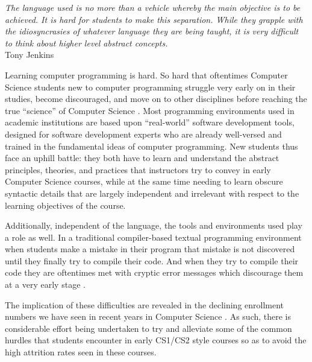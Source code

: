 \label{chapter:introduction}

\begin{flushright}
\textit{The language used is no more than a vehicle whereby the main objective is to be achieved. It is hard for students to make this separation. While they grapple with the idiosyncrasies of whatever language they are being taught, it is very difficult to think about higher level abstract concepts.}
\\
Tony Jenkins \cite{Jenkins02} \\
\end{flushright}

Learning computer programming is hard.  So hard that oftentimes Computer Science students new to computer programming struggle
very early on in their studies, become discouraged, and move on to other disciplines before reaching the true ``science'' of Computer Science \cite{Beaubouef05}.  Most programming environments used in academic institutions are based upon ``real-world'' software development tools, designed for software development experts who are already well-versed and trained in the fundamental ideas of computer programming.  New students thus face an uphill battle: they both have to learn and understand the abstract principles, theories, and practices that instructors try to convey in early Computer Science courses, while at the same time needing to learn obscure syntactic details that are largely independent and irrelevant with respect to the learning objectives of the course.

Additionally, independent of the language, the tools and environments used play a role as well.  In a traditional compiler-based textual programming environment when students make a mistake in their program that mistake is not discovered until they finally try to compile their code.  And when they try to compile their code they are oftentimes met with cryptic error messages which discourage them at a very early stage \cite{Jenkins02,Hundhausen09,Kelleher05}.

The implication of these difficulties are revealed in the declining enrollment numbers we have seen in recent years in Computer Science \cite{Manaris07,Vesgo07,Ward08,Bayliss09}.  As such, there is considerable effort being undertaken to try and alleviate some of the common hurdles that students encounter in early CS1/CS2 style courses so as to avoid the high attrition rates seen in these courses.

